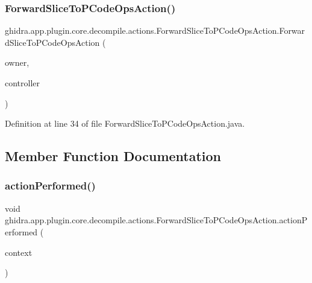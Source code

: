 \subsubsection{\texorpdfstring{ForwardSliceToPCodeOpsAction()}{ForwardSliceToPCodeOpsAction()}}
{\footnotesize\ttfamily ghidra.\+app.\+plugin.\+core.\+decompile.\+actions.\+Forward\+Slice\+To\+P\+Code\+Ops\+Action.\+Forward\+Slice\+To\+P\+Code\+Ops\+Action (\begin{DoxyParamCaption}\item[{String}]{owner,  }\item[{\mbox{\hyperlink{classghidra_1_1app_1_1decompiler_1_1component_1_1_decompiler_controller}{Decompiler\+Controller}}}]{controller }\end{DoxyParamCaption})\hspace{0.3cm}{\ttfamily [inline]}}



Definition at line 34 of file Forward\+Slice\+To\+P\+Code\+Ops\+Action.\+java.



\subsection{Member Function Documentation}
\mbox{\label{classghidra_1_1app_1_1plugin_1_1core_1_1decompile_1_1actions_1_1_forward_slice_to_p_code_ops_action_ab96fb3bdfa2b676c3d2202539dc6a179}} 
\subsubsection{\texorpdfstring{actionPerformed()}{actionPerformed()}}
{\footnotesize\ttfamily void ghidra.\+app.\+plugin.\+core.\+decompile.\+actions.\+Forward\+Slice\+To\+P\+Code\+Ops\+Action.\+action\+Performed (\begin{DoxyParamCaption}\item[{Action\+Context}]{context }\end{DoxyParamCaption})\hspace{0.3cm}{\ttfamily [inline]}}



